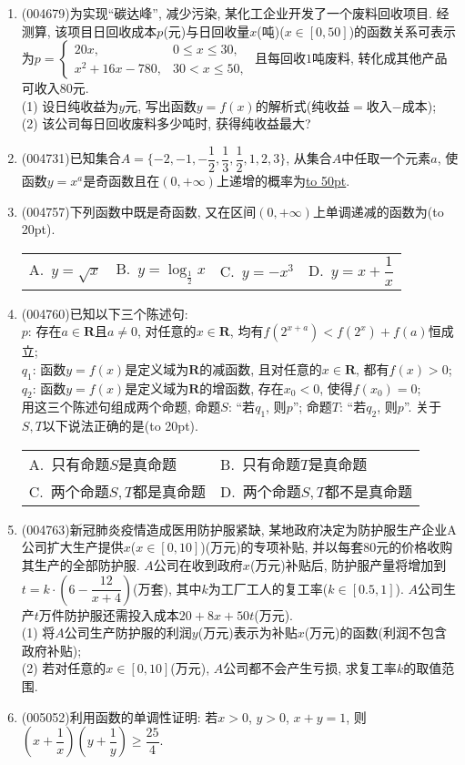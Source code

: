 \documentclass[10pt,a4paper]{article}
\newcommand{\blank}[1]{\underline{\hbox to #1pt{}}}
\newcommand{\bracket}[1]{(\hbox to #1pt{})}
\newcommand{\twoch}[4]{\par\begin{tabular}{p{.46\textwidth}p{.46\textwidth}}
A.~#1& B.~#2\\
C.~#3& D.~#4
\end{tabular}}
\newcommand{\fourch}[4]{\par\begin{tabular}{p{.23\textwidth}p{.23\textwidth}p{.23\textwidth}p{.23\textwidth}}
A.~#1 &B.~#2& C.~#3& D.~#4
\end{tabular}}
\begin{document}
\begin{enumerate}[1.]
\fourch{充分非必要条件}{必要非充分条件}{充要条件}{既非充分又非必要条件}
\item {\tiny (004679)}为实现``碳达峰'', 减少污染, 某化工企业开发了一个废料回收项目. 经测算, 该项目日回收成本$p$(元)与日回收量$x$(吨)($x\in [0,50]$)的函数关系可表示为$p=\begin{cases}20x, & 0\le x\le 30,  \\ x^2+16x-780, & 30<x \le 50,  \end{cases}$ 且每回收$1$吨废料, 转化成其他产品可收入$80$元.\\
(1) 设日纯收益为$y$元, 写出函数$y=f(x)$的解析式(纯收益$=$收入$-$成本);\\
(2) 该公司每日回收废料多少吨时, 获得纯收益最大?
\item {\tiny (004731)}已知集合$A=\{-2,-1,-\dfrac 12,\dfrac 13,\dfrac 12,1,2,3\}$, 从集合$A$中任取一个元素$a$, 使函数$y=x^a$是奇函数且在$(0,+\infty)$上递增的概率为\blank{50}.
\item {\tiny (004757)}下列函数中既是奇函数, 又在区间$(0,+\infty)$上单调递减的函数为\bracket{20}.
\fourch{$y=\sqrt x$}{$y=\log_{\frac 12}x$}{$y=-x^3$}{$y=x+\dfrac 1x$}
\item {\tiny (004760)}已知以下三个陈述句:\\
$p$: 存在$a\in \mathbf{R}$且$a\ne 0$, 对任意的$x\in \mathbf{R}$, 均有$f(2^{x+a})<f(2^x)+f(a)$恒成立;\\
$q_1$: 函数$y=f(x)$是定义域为$\mathbf{R}$的减函数, 且对任意的$x\in \mathbf{R}$, 都有$f(x)>0$;\\
$q_2$: 函数$y=f(x)$是定义域为$\mathbf{R}$的增函数, 存在$x_0<0$, 使得$f(x_0)=0$;\\
用这三个陈述句组成两个命题, 命题$S$: ``若$q_1$, 则$p$''; 命题$T$: ``若$q_2$, 则$p$''. 关于$S,T$以下说法正确的是\bracket{20}.
\twoch{只有命题$S$是真命题}{只有命题$T$是真命题}{两个命题$S,T$都是真命题}{两个命题$S,T$都不是真命题}
\item {\tiny (004763)}新冠肺炎疫情造成医用防护服紧缺, 某地政府决定为防护服生产企业A公司扩大生产提供$x$($x\in [0,10]$)(万元)的专项补贴, 并以每套$80$元的价格收购其生产的全部防护服. $A$公司在收到政府$x$(万元)补贴后, 防护服产量将增加到$t=k\cdot (6-\dfrac{12}{x+4})$(万套), 其中$k$为工厂工人的复工率($k\in [0.5,1]$). $A$公司生产$t$万件防护服还需投入成本$20+8x+50t$(万元).\\
(1) 将$A$公司生产防护服的利润$y$(万元)表示为补贴$x$(万元)的函数(利润不包含政府补贴);\\
(2) 若对任意的$x\in [0,10]$(万元), $A$公司都不会产生亏损, 求复工率$k$的取值范围.
\item {\tiny (005052)}利用函数的单调性证明: 若$x>0$, $y>0$, $x+y=1$, 则$(x+\dfrac 1x)(y+\dfrac 1y)\ge \dfrac{25}4$.

\end{enumerate}
\end{document}
